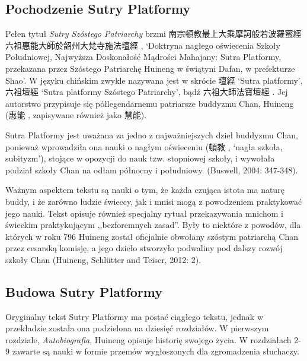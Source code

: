 \subsection{Pochodzenie Sutry Platformy}

Pełen tytuł \emph{Sutry Szóstego Patriarchy} brzmi 南宗頓教最上大乘摩訶般若波羅蜜經六祖惠能大師於韶州大梵寺施法壇經 , `Doktryna nagłego oświecenia Szkoły Południowej, Najwyższa Doskonałość Mądrości Mahajany: Sutra Platformy, przekazana przez Szóstego Patriarchę Huineng w świątyni Dafan, w prefekturze Shao'. W języku chińskim zwykle nazywana jest w skrócie 壇經  `Sutra platformy', 六祖壇經  `Sutra platformy Szóstego Patriarchy', bądź 六祖大師法寶壇經 . Jej autorstwo przypisuje się półlegendarnemu patriarsze buddyzmu Chan, Huineng (惠能 , zapisywane również jako 慧能). %

Sutra Platformy jest uważana za jedno z najważniejszych dzieł buddyzmu Chan, ponieważ wprowadziła ona nauki o nagłym oświeceniu (頓教 , `nagła szkoła, subityzm'), stojące w opozycji do nauk tzw. stopniowej szkoły, i wywołała podział szkoły Chan na odłam północny i południowy. %
(Buswell, 2004: 347-348).%

Ważnym aspektem tekstu są nauki o tym, że każda czująca istota ma naturę buddy, i że zarówno ludzie świeccy, jak i mnisi mogą z powodzeniem praktykować jego nauki. Tekst opisuje również specjalny rytuał przekazywania mnichom i świeckim praktykującym ,,bezforemnych zasad''. %
Były to niektóre z powodów, dla których w roku 796 Huineng został oficjalnie obwołany szóstym patriarchą Chan przez cesarską komisję, a jego dzieło stworzyło podwaliny pod dalszy rozwój szkoły Chan
(Huineng, Schlütter and Teiser, 2012: 2).

\subsection{Budowa Sutry Platformy}
Oryginalny tekst Sutry Platformy ma postać ciągłego tekstu, jednak w przekładzie została ona podzielona na dziesięć rozdziałów. W pierwszym rozdziale, \emph{Autobiografia}, Huineng opisuje historię swojego życia. W rozdziałach 2-9 zawarte są nauki w formie przemów wygłoszonych dla zgromadzenia słuchaczy. 
\fi

